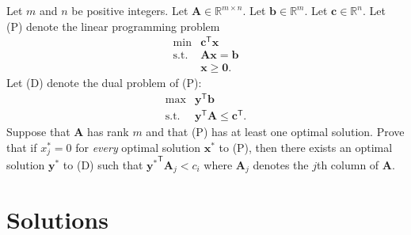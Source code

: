 \documentclass[]{book}
\def\lt{<}
\newcommand{\T}{\mathsf{T}}
\newcommand{\mm}[1]{\mathbf{#1}}
\renewcommand{\vec}[1]{\mathbf{#1}}
\theoremstyle{definition}
\theoremstyle{definition}
\theoremstyle{remark}
\begin{document}
\begin{enumerate}
  Let \(m\) and \(n\) be positive integers. Let
  \(\mm{A}\in \mathbb{R}^{m\times n}\). Let
  \(\vec{b}\in \mathbb{R}^{m}\). Let \(\vec{c}\in \mathbb{R}^{n}\). Let
  (P) denote the linear programming problem \[\begin{array}{rl}
  \min & \vec{c}^\mathsf{T} \vec{x} \\
  \text{s.t.} & \mm{A} \vec{x} = \vec{b} \\
  & \vec{x} \geq \vec{0}.
  \end{array}
  \] Let (D) denote the dual problem of (P): \[\begin{array}{rl}
  \max & \vec{y}^\mathsf{T} \vec{b} \\
  \text{s.t.} & \vec{y}^\T \mm{A} \leq
  \vec{c}^\mathsf{T}.
  \end{array}
  \] Suppose that \(\mm{A}\) has rank \(m\) and that (P) has at least
  one optimal solution. Prove that if \(x^*_j = 0\) for \emph{every}
  optimal solution \(\mm{x}^*\) to (P), then there exists an optimal
  solution \(\vec{y}^*\) to (D) such that
  \({\vec{y}^*}^\T\mm{A}_j \lt c_i\) where \(\mm{A}_j\) denotes the
  \(j\)th column of \(\mathbf{A}\).
\end{enumerate}

\section*{Solutions}\label{solutions-7}
\end{document}
